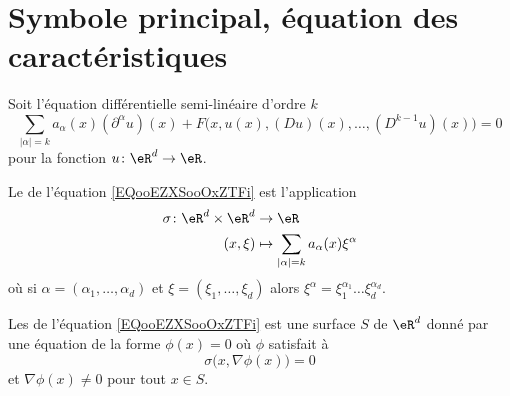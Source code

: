 
\section{Symbole principal, équation des caractéristiques}

Soit l'équation différentielle semi-linéaire d'ordre \( k\)
\begin{equation}        \label{EQooEZXSooOxZTFi}
    \sum_{| \alpha |=k}a_{\alpha}(x)(\partial^{\alpha}u)(x)+F\Big( x,u(x),(Du)(x),\ldots, (D^{k-1}u)(x) \Big)=0
\end{equation}
pour la fonction \( u\colon \eR^d\to \eR\).

\begin{definition}
    Le  de l'équation \eqref{EQooEZXSooOxZTFi} est l'application
    \begin{equation}
        \begin{aligned}
            \sigma\colon \eR^d\times \eR^d&\to \eR \\
            (x,\xi)&\mapsto \sum_{| \alpha |=k}a_{\alpha}(x)\xi^{\alpha}
        \end{aligned}
    \end{equation}
    où si \( \alpha=(\alpha_1,\ldots, \alpha_d)\) et \( \xi=(\xi_1,\ldots, \xi_d)\) alors \( \xi^{\alpha}=\xi_1^{\alpha_1}\ldots\xi_d^{\alpha_d}\).
\end{definition}

\begin{definition}      \label{DEFooYYNOooZlZMxu}
    Les  de l'équation \eqref{EQooEZXSooOxZTFi} est une surface \( S\) de \( \eR^d\) donné par une équation de la forme \( \phi(x)=0\) où \( \phi\) satisfait à
    \begin{equation}
        \sigma\big( x,\nabla\phi(x) \big)=0
    \end{equation}
    et \( \nabla\phi(x)\neq 0\) pour tout \( x\in S\).
\end{definition}

